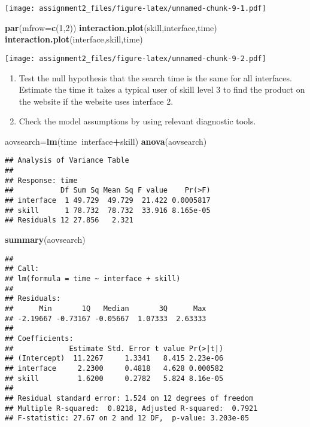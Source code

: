 \documentclass[]{article}
\newenvironment{Shaded}{\begin{snugshade}}{\end{snugshade}}
\newcommand{\DataTypeTok}[1]{\textcolor[rgb]{0.13,0.29,0.53}{#1}}
\newcommand{\DecValTok}[1]{\textcolor[rgb]{0.00,0.00,0.81}{#1}}
\newcommand{\KeywordTok}[1]{\textcolor[rgb]{0.13,0.29,0.53}{\textbf{#1}}}
\newcommand{\NormalTok}[1]{#1}
\newcommand{\OperatorTok}[1]{\textcolor[rgb]{0.81,0.36,0.00}{\textbf{#1}}}
\providecommand{\tightlist}{%
  \setlength{\itemsep}{0pt}\setlength{\parskip}{0pt}}
\begin{document}
\texttt{[image: assignment2\_files/figure-latex/unnamed-chunk-9-1.pdf]}

\begin{Shaded}
\begin{Highlighting}[]
\KeywordTok{par}\NormalTok{(}\DataTypeTok{mfrow=}\KeywordTok{c}\NormalTok{(}\DecValTok{1}\NormalTok{,}\DecValTok{2}\NormalTok{))}
\KeywordTok{interaction.plot}\NormalTok{(skill,interface,time)}
\KeywordTok{interaction.plot}\NormalTok{(interface,skill,time)}
\end{Highlighting}
\end{Shaded}

\texttt{[image: assignment2\_files/figure-latex/unnamed-chunk-9-2.pdf]}

\begin{enumerate}
\def\labelenumi{\alph{enumi})}
\setcounter{enumi}{2}
\tightlist
\item
  Test the null hypothesis that the search time is the same for all
  interfaces. Estimate the time it takes a typical user of skill level 3
  to find the product on the website if the website uses interface 2.
\item
  Check the model assumptions by using relevant diagnostic tools.
\end{enumerate}

\begin{Shaded}
\begin{Highlighting}[]
\NormalTok{aovsearch=}\KeywordTok{lm}\NormalTok{(time}\OperatorTok{~}\NormalTok{interface}\OperatorTok{+}\NormalTok{skill)}
\KeywordTok{anova}\NormalTok{(aovsearch)}
\end{Highlighting}
\end{Shaded}

\begin{verbatim}
## Analysis of Variance Table
## 
## Response: time
##           Df Sum Sq Mean Sq F value    Pr(>F)
## interface  1 49.729  49.729  21.422 0.0005817
## skill      1 78.732  78.732  33.916 8.165e-05
## Residuals 12 27.856   2.321
\end{verbatim}

\begin{Shaded}
\begin{Highlighting}[]
\KeywordTok{summary}\NormalTok{(aovsearch)}
\end{Highlighting}
\end{Shaded}

\begin{verbatim}
## 
## Call:
## lm(formula = time ~ interface + skill)
## 
## Residuals:
##      Min       1Q   Median       3Q      Max 
## -2.19667 -0.73167 -0.05667  1.07333  2.63333 
## 
## Coefficients:
##             Estimate Std. Error t value Pr(>|t|)
## (Intercept)  11.2267     1.3341   8.415 2.23e-06
## interface     2.2300     0.4818   4.628 0.000582
## skill         1.6200     0.2782   5.824 8.16e-05
## 
## Residual standard error: 1.524 on 12 degrees of freedom
## Multiple R-squared:  0.8218, Adjusted R-squared:  0.7921 
## F-statistic: 27.67 on 2 and 12 DF,  p-value: 3.203e-05
\end{verbatim}
\end{document}

